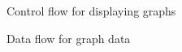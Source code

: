 \begin{figure}[htbp]
    \caption{\label{fig:maw_controlflow} Control flow for displaying graphs}
\end{figure}

\begin{figure}[thbp]
    \caption{\label{fig:maw_dataflow} Data flow for graph data}
\end{figure}

